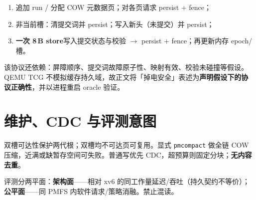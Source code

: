\begin{enumerate}[leftmargin=2em]
  \item 追加 run / 分配 COW 元数据页；对各页请求 persist + fence；
  \item 非当前槽：清提交词并 persist；写入新头（未提交）并 persist；
  \item \textbf{一次 8\,B store}写入提交状态与校验 $\rightarrow$ persist + fence；再更新内存 epoch/槽。
\end{enumerate}

该协议还依赖：屏障顺序、提交词故障原子性、映射有效、校验未碰撞等假设。QEMU TCG 不模拟缓存持久域，故正文将「掉电安全」表述为\textbf{声明假设下的协议正确性}，并以进程重启 oracle 验证。

\section{维护、CDC 与评测意图}

双槽可达性保护两代根；双槽均不可达页可复用。显式 \texttt{pmcompact} 做全链 COW 压缩，近满或缺暂存空间可失败。普通写优先 CDC，超预算则固定分块；\textbf{无内容去重}。

评测分两平面：\textbf{架构面}——相对 xv6 的同工作量延迟/吞吐（持久契约不等价）；\textbf{公平面}——同 PMFS 内软件请求/策略消融。禁止混读。
